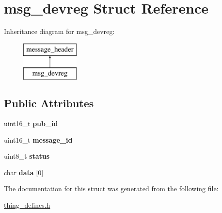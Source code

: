 \hypertarget{structmsg__devreg}{\section{msg\-\_\-devreg Struct Reference}
\label{structmsg__devreg}
}
Inheritance diagram for msg\-\_\-devreg\-:\begin{figure}[H]
\begin{center}
\leavevmode
\includegraphics[height=2.000000cm]{structmsg__devreg}
\end{center}
\end{figure}
\subsection*{Public Attributes}
\begin{DoxyCompactItemize}
\item 
\hypertarget{structmsg__devreg_a77888724fda6f1adac16d4a346bd84be}{uint16\-\_\-t {\bfseries pub\-\_\-id}}\label{structmsg__devreg_a77888724fda6f1adac16d4a346bd84be}

\item 
\hypertarget{structmsg__devreg_a4da49bb64f4800ae14644439974108fc}{uint16\-\_\-t {\bfseries message\-\_\-id}}\label{structmsg__devreg_a4da49bb64f4800ae14644439974108fc}

\item 
\hypertarget{structmsg__devreg_ab669c3e7543979798cc5bf9b9cc1ea47}{uint8\-\_\-t {\bfseries status}}\label{structmsg__devreg_ab669c3e7543979798cc5bf9b9cc1ea47}

\item 
\hypertarget{structmsg__devreg_af0494e12edecd91bf4add32d2fe610c0}{char {\bfseries data} \mbox{[}0\mbox{]}}\label{structmsg__devreg_af0494e12edecd91bf4add32d2fe610c0}

\end{DoxyCompactItemize}


The documentation for this struct was generated from the following file\-:\begin{DoxyCompactItemize}
\item 
\hyperlink{thing__defines_8h}{thing\-\_\-defines.\-h}\end{DoxyCompactItemize}
